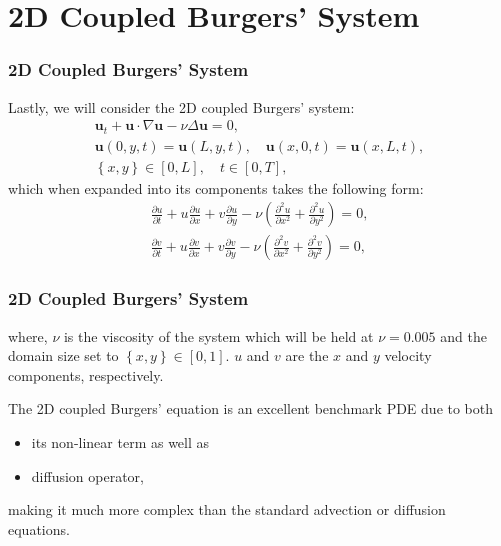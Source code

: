 \documentclass{beamer}
\theoremstyle{remark}
\newcommand{\viscosity}{\nu}
\begin{document}
\section{2D Coupled Burgers' System}

\begin{frame}
\frametitle{2D Coupled Burgers' System}
Lastly, we will consider the 2D coupled Burgers' system:
\begin{gather}
    \bm{u}_t + \bm{u}\cdot \nabla \bm{u} - \viscosity \Delta \bm{u} = 0,\\
    \bm{u}(0,y,t) = \bm{u}(L,y,t), \quad \bm{u}(x,0,t) = \bm{u}(x,L,t), \\
    \left\{x,y \right\} \in [0,L], \quad t\in[0,T],
\end{gather}
which when expanded into its components takes the following form:
\begin{equation}
    \begin{aligned}
        {\frac{\partial u}{\partial t}+u \frac{\partial u}{\partial x}+v \frac{\partial u}{\partial y} - \viscosity \left(\frac{\partial^{2} u}{\partial x^{2}}+\frac{\partial^{2} u}{\partial y^{2}}\right)} = 0, \\ 
        {\frac{\partial v}{\partial t}+u \frac{\partial v}{\partial x}+v \frac{\partial v}{\partial y} - \viscosity \left(\frac{\partial^{2} v}{\partial x^{2}}+\frac{\partial^{2} v}{\partial y^{2}}\right)} = 0,
    \end{aligned}
\end{equation}

\end{frame}

\begin{frame}
\frametitle{2D Coupled Burgers' System}
where,
 $\viscosity$ is the viscosity of the system which will be held at $\nu=0.005$ and the domain size set to $\left\{x,y \right\} \in [0,1]$.
$u$ and $v$ are the $x$ and $y$ velocity components, respectively.

The 2D coupled Burgers' equation is an excellent benchmark PDE due to both
\begin{itemize}
\item{its non-linear term as well as}
\item{diffusion operator,}
\end{itemize} 
making it much more complex than the standard advection or diffusion equations.

\end{frame}
\end{document}
